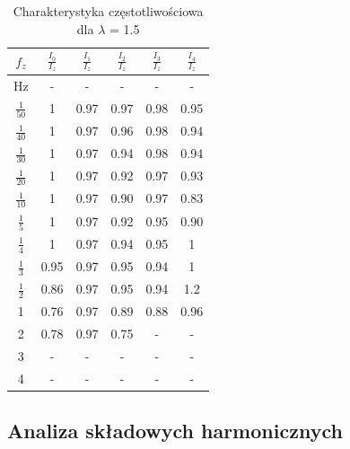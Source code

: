 \documentclass[journal,twoside,web]{ieeecolor}
\begin{document}
\begin{table}[h]
	\centering
	\caption{Charakterystyka częstotliwościowa dla $\lambda$ = 1.5}
	\label{tab:lam15} %
	\begin{tabular}{|c|c|c|c|c|c|}
		\hline
		$f_z$ & $\frac{I_{0}}{I_z}$ & $\frac{I_{1}}{I_z}$ & $\frac{I_{2}}{I_z}$ & $\frac{I_{3}}{I_z}$ & $\frac{I_{4}}{I_z}$ \\
		\hline
		Hz & - & - & - & - & - \\
		\hline
		$\frac{1}{50}$ & 1 & 0.97 & 0.97 & 0.98 & 0.95 \\
		\hline
		$\frac{1}{40}$ & 1 & 0.97 & 0.96 & 0.98 & 0.94 \\
		\hline
		$\frac{1}{30}$ & 1 & 0.97 & 0.94 & 0.98 & 0.94 \\
		\hline
		$\frac{1}{20}$ & 1 & 0.97 & 0.92 & 0.97 & 0.93 \\
		\hline
		$\frac{1}{10}$ & 1 & 0.97 & 0.90 & 0.97 & 0.83 \\
		\hline
		$\frac{1}{5}$ & 1 & 0.97 & 0.92 & 0.95 & 0.90 \\
		\hline
		$\frac{1}{4}$ & 1 & 0.97 & 0.94 & 0.95 & 1 \\
		\hline
		$\frac{1}{3}$ & 0.95 & 0.97 & 0.95 & 0.94 &1 \\
		\hline
		$\frac{1}{2}$ & 0.86 & 0.97 & 0.95 & 0.94 & 1.2 \\
		\hline
		1 & 			0.76 & 0.97 & 0.89 & 0.88 & 0.96 \\
		\hline
		2 & 			0.78 & 0.97 & 0.75 & - & - \\
		\hline
		3 & 			-	 & -    & - & - & - \\
		\hline
		4 & - & - & - & - & - \\
		\hline
	\end{tabular}
\end{table}

\subsection{Analiza składowych harmonicznych}
\end{document}
